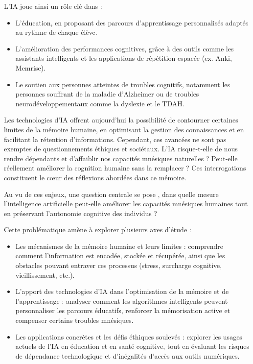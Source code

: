 \documentclass[11pt,a4paper]{report}
\begin{document}
L’IA joue ainsi un rôle clé dans :
\begin{itemize}

    \item L’éducation, en proposant des parcours d’apprentissage personnalisés adaptés au rythme de chaque élève.
    \item L’amélioration des performances cognitives, grâce à des outils comme les assistants intelligents et les applications de répétition espacée (ex. Anki, Memrise).
    \item Le soutien aux personnes atteintes de troubles cognitifs, notamment les personnes souffrant de la maladie d’Alzheimer ou de troubles neurodéveloppementaux comme la dyslexie et le TDAH.

\end{itemize}

Les technologies d’IA offrent aujourd’hui la possibilité de contourner certaines limites de la mémoire humaine, en optimisant la gestion des connaissances et en facilitant la rétention d’informations. Cependant, ces avancées ne sont pas exemptes de questionnements éthiques et sociétaux. L’IA risque-t-elle de nous rendre dépendants et d’affaiblir nos capacités mnésiques naturelles ? Peut-elle réellement améliorer la cognition humaine sans la remplacer ? Ces interrogations constituent le cœur des réflexions abordées dans ce mémoire.

Au vu de ces enjeux, une question centrale se pose , dans quelle mesure l’intelligence artificielle peut-elle améliorer les capacités mnésiques humaines tout en préservant l’autonomie cognitive des individus ?

Cette problématique amène à explorer plusieurs axes d’étude :
\begin{itemize}

    \item Les mécanismes de la mémoire humaine et leurs limites : comprendre comment l’information est encodée, stockée et récupérée, ainsi que les obstacles pouvant entraver ces processus (stress, surcharge cognitive, vieillissement, etc.).

    \item L’apport des technologies d’IA dans l’optimisation de la mémoire et de l’apprentissage : analyser comment les algorithmes intelligents peuvent personnaliser les parcours éducatifs, renforcer la mémorisation active et compenser certains troubles mnésiques.

    \item Les applications concrètes et les défis éthiques soulevés : explorer les usages actuels de l’IA en éducation et en santé cognitive, tout en évaluant les risques de dépendance technologique et d’inégalités d’accès aux outils numériques.

\end{itemize}
\end{document}
